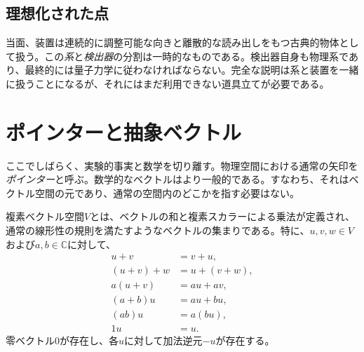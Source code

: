 \subsection{理想化された点}

当面、装置は連続的に調整可能な向きと離散的な読み出しをもつ古典的物体として扱う。この\emph{系}と\emph{検出器}の分割は一時的なものである。検出器自身も物理系であり、最終的には量子力学に従わなければならない。完全な説明は系と装置を一緒に扱うことになるが、それにはまだ利用できない道具立てが必要である。

\begin{classroomqa}
\end{classroomqa}

\begin{classroomqa}
\end{classroomqa}

\begin{classroomqa}
\end{classroomqa}

\section{ポインターと抽象ベクトル}

ここでしばらく、実験的事実と数学を切り離す。物理空間における通常の矢印を\emph{ポインター}と呼ぶ。数学的なベクトルはより一般的である。すなわち、それはベクトル空間の元であり、通常の空間内のどこかを指す必要はない。

\begin{definition}
複素ベクトル空間\(V\)とは、ベクトルの和と複素スカラーによる乗法が定義され、通常の線形性の規則を満たすようなベクトルの集まりである。特に、\(u,v,w\in V\)および\(a,b\in\mathbb C\)に対して、
\begin{align}
  u+v&=v+u,\\
  (u+v)+w&=u+(v+w),\\
  a(u+v)&=au+av,\\
  (a+b)u&=au+bu,\\
  (ab)u&=a(bu),\\
  1u&=u.
\end{align}
零ベクトル\(0\)が存在し、各\(u\)に対して加法逆元\(-u\)が存在する。
\end{definition}

